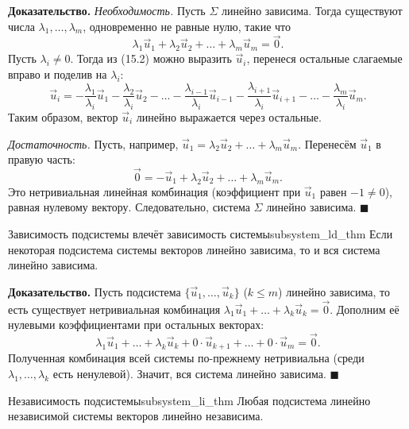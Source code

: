 \documentclass[12pt,a4paper]{article}
\newenvironment{myproof}{\noindent\textbf{Доказательство.}}{\hfill$\blacksquare$}
\begin{document}
\begin{myproof}
  \textit{Необходимость.} Пусть $\Sigma$ линейно зависима. Тогда
  существуют числа $\lambda_1, \dots, \lambda_m$, одновременно не равные
  нулю, такие что
  \begin{equation}
    \lambda_1 \vec{u}_1 + \lambda_2 \vec{u}_2 + \dots + \lambda_m
    \vec{u}_m = \vec{0}.
    \tag{15.2}
  \end{equation}
  Пусть $\lambda_i \neq 0$. Тогда из (15.2) можно выразить $\vec{u}_i$,
  перенеся остальные слагаемые вправо и поделив на $\lambda_i$:
  \[
    \vec{u}_i = -\frac{\lambda_1}{\lambda_i}\vec{u}_1 -
    \frac{\lambda_2}{\lambda_i}\vec{u}_2 - \dots -
    \frac{\lambda_{i-1}}{\lambda_i}\vec{u}_{i-1} -
    \frac{\lambda_{i+1}}{\lambda_i}\vec{u}_{i+1} - \dots -
    \frac{\lambda_m}{\lambda_i}\vec{u}_m.
  \]
  Таким образом, вектор $\vec{u}_i$ линейно выражается через остальные.

  \textit{Достаточность.} Пусть, например, $\vec{u}_1 = \lambda_2 \vec{u}_2
  + \dots + \lambda_m \vec{u}_m$. Перенесём $\vec{u}_1$ в правую часть:
  \[
    \vec{0} = -\vec{u}_1 + \lambda_2 \vec{u}_2 + \dots + \lambda_m
    \vec{u}_m.
  \]
  Это нетривиальная линейная комбинация (коэффициент при $\vec{u}_1$ равен
  $-1 \neq 0$), равная нулевому вектору. Следовательно, система $\Sigma$
  линейно зависима.
\end{myproof}

\begin{theorem}{Зависимость подсистемы влечёт зависимость
  системы}{subsystem_ld_thm}
  Если некоторая подсистема системы векторов линейно зависима, то и вся
  система линейно зависима.
\end{theorem}

\begin{myproof}
  Пусть подсистема $\{\vec{u}_1, \dots, \vec{u}_k\}$ ($k \le m$) линейно
  зависима, то есть существует нетривиальная комбинация $\lambda_1
  \vec{u}_1 + \dots + \lambda_k \vec{u}_k = \vec{0}$. Дополним её
  нулевыми коэффициентами при остальных векторах:
  \[
    \lambda_1 \vec{u}_1 + \dots + \lambda_k \vec{u}_k + 0\cdot
    \vec{u}_{k+1} + \dots + 0\cdot \vec{u}_m = \vec{0}.
  \]
  Полученная комбинация всей системы по-прежнему нетривиальна (среди
  $\lambda_1, \dots, \lambda_k$ есть ненулевой). Значит, вся система
  линейно зависима.
\end{myproof}

\begin{theorem}{Независимость подсистемы}{subsystem_li_thm}
  Любая подсистема линейно независимой системы векторов линейно
  независима.
\end{theorem}
\end{document}
